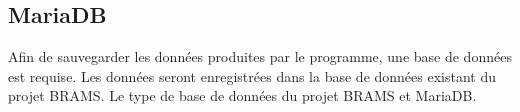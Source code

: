 \documentclass[11pt]{article}
\begin{document}

\subsection{MariaDB}

Afin de sauvegarder les données produites par le programme, une base de données est requise.
Les données seront enregistrées dans la base de données existant du projet BRAMS.
Le type de base de données du projet BRAMS et MariaDB.

\newpage
\end{document}

